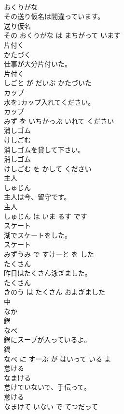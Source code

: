 \documentclass[8pt]{extreport}
\begin{document}
\begin{CJK}{UTF8}{min}
\\	おくりがな			
\\	その送り仮名は間違っています。	
\\	送り仮名 
\\	その おくりがな は まちがって います			
\\	片付く	
\\	かたづく			
\\	仕事が大分片付いた。	
\\	片付く 
\\	しごと が だいぶ かたづいた			
\\	カップ	
\\	水を1カップ入れてください。	
\\	カップ 
\\	みず を いちかっぷ いれて ください			
\\	消しゴム	
\\	けしごむ			
\\	消しゴムを貸して下さい。	
\\	消しゴム 
\\	けしごむ を かして ください			
\\	主人	
\\	しゅじん			
\\	主人は今、留守です。	
\\	主人 
\\	しゅじん は いま るす です			
\\	スケート	
\\	湖でスケートをした。	
\\	スケート 
\\	みずうみ で すけーと を した			
\\	たくさん	
\\	昨日はたくさん泳ぎました。	
\\	たくさん 
\\	きのう は たくさん およぎました			
\\	中	
\\	なか			
\\	鍋	
\\	なべ			
\\	鍋にスープが入っているよ。	
\\	鍋 
\\	なべ に すーぷ が はいって いる よ			
\\	怠ける	
\\	なまける			
\\	怠けていないで、手伝って。	
\\	怠ける 
\\	なまけて いない で てつだって			

\end{CJK}
\end{document}

